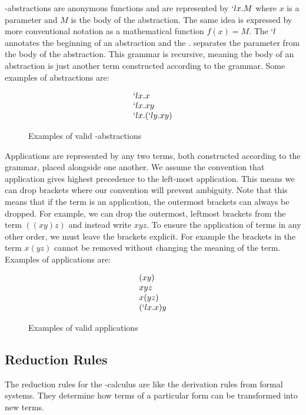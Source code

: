   \lam-abstractions are anonymous functions and are represented by $`lx.M$ where $x$ is a parameter and $M$ is the body of the abstraction. 
  The same idea is expressed by more conventional notation as a mathematical function $f(x) = M$. 
  The $`l$ annotates the beginning of an abstraction and the $.$ separates the parameter from the body of the abstraction.
  This grammar is recursive, meaning the body of an abstraction is just another term constructed according to the grammar. 
  Some examples of abstractions are:
  
  \begin{figure}[!h]
    \[
      \begin{array}{l}
      `lx.x \\
      `lx.xy \\
      `lx.(`ly.xy)
      \end{array}
    \]
  \caption{Examples of valid \lam-abstractions}
  \end{figure}
  
  Applications are represented by any two terms, 
    both constructed according to the grammar, 
  placed alongside one another. 
  We assume the convention that application gives highest precedence to the left-most application. 
  This means we can drop brackets where our convention will prevent ambiguity.
  Note that this means that if the term is an application, the outermost brackets can always be dropped.
  For example, we can drop the outermost, leftmost brackets from the term $((xy)z)$ and instead write $xyz$.
  To ensure the application of terms in any other order, we must leave the brackets explicit.
  For example the brackets in the term $x(yz)$ cannot be removed without changing the meaning of the term.
  Examples of applications are:
    \begin{figure}[!h]
      \[
        \begin{array}{l}
        (xy) \\
        xyz \\
        x(yz) \\
        (`lx.x)y
        \end{array}
      \]
    \caption{Examples of valid applications}
    \end{figure}

\subsection{Reduction Rules}
  
  The reduction rules for the \lam-calculus are like the derivation rules from formal systems.
  They determine how terms of a particular form can be transformed into new terms.
  
